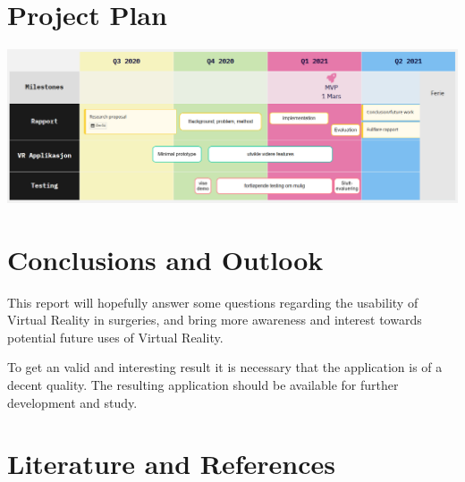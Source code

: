 \documentclass[12pt]{scrartcl}
\begin{document}
\section{Project Plan}

\includegraphics[width=\textwidth]{timeline.png}

\section{Conclusions and Outlook}

This report will hopefully answer some questions regarding the usability of Virtual Reality in
surgeries, and bring more awareness and interest towards potential future uses
of Virtual Reality. 

To get an valid and interesting result it is necessary that the application is of a
decent quality. The resulting application should be available for further
development and study.


\section{Literature and References}


\printbibliography
\end{document}
